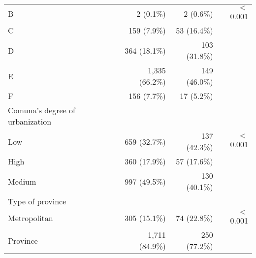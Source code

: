 \begin{table}[H]
\begin{tabular}{llll}
\multicolumn{1}{l}{\hspace{1em}B} &
  \multicolumn{1}{r}{2 (0.1\%)} &
  \multicolumn{1}{r}{2 (0.6\%)} &
  \multicolumn{1}{r}{$<$0.001} \\
\multicolumn{1}{l}{\hspace{1em}C} &
  \multicolumn{1}{r}{159 (7.9\%)} &
  \multicolumn{1}{r}{53 (16.4\%)} &
  \multicolumn{1}{r}{} \\
\multicolumn{1}{l}{\hspace{1em}D} &
  \multicolumn{1}{r}{364 (18.1\%)} &
  \multicolumn{1}{r}{103 (31.8\%)} &
  \multicolumn{1}{r}{} \\
\multicolumn{1}{l}{\hspace{1em}E} &
  \multicolumn{1}{r}{1,335 (66.2\%)} &
  \multicolumn{1}{r}{149 (46.0\%)} &
  \multicolumn{1}{r}{} \\
\multicolumn{1}{l}{\hspace{1em}F} &
  \multicolumn{1}{r}{156 (7.7\%)} &
  \multicolumn{1}{r}{17 (5.2\%)} &
  \multicolumn{1}{r}{} \\
\multicolumn{1}{l}{Comuna's degree of urbanization} &
  \multicolumn{1}{r}{} &
  \multicolumn{1}{r}{} &
  \multicolumn{1}{r}{} \\
\multicolumn{1}{l}{\hspace{1em}Low} &
  \multicolumn{1}{r}{659 (32.7\%)} &
  \multicolumn{1}{r}{137 (42.3\%)} &
  \multicolumn{1}{r}{$<$0.001} \\
\multicolumn{1}{l}{\hspace{1em}High} &
  \multicolumn{1}{r}{360 (17.9\%)} &
  \multicolumn{1}{r}{57 (17.6\%)} &
  \multicolumn{1}{r}{} \\
\multicolumn{1}{l}{\hspace{1em}Medium} &
  \multicolumn{1}{r}{997 (49.5\%)} &
  \multicolumn{1}{r}{130 (40.1\%)} &
  \multicolumn{1}{r}{} \\
\multicolumn{1}{l}{Type of province} &
  \multicolumn{1}{r}{} &
  \multicolumn{1}{r}{} &
  \multicolumn{1}{r}{} \\
\multicolumn{1}{l}{\hspace{1em}Metropolitan} &
  \multicolumn{1}{r}{305 (15.1\%)} &
  \multicolumn{1}{r}{74 (22.8\%)} &
  \multicolumn{1}{r}{$<$0.001} \\
\multicolumn{1}{l}{\hspace{1em}Province} &
  \multicolumn{1}{r}{1,711 (84.9\%)} &
  \multicolumn{1}{r}{250 (77.2\%)} &
  \multicolumn{1}{r}{} \\
\cline{1-4}
\end{tabular}
\end{table}
